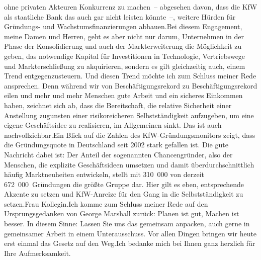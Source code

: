 \documentclass{article}
\begin{document}
ohne privaten Akteuren Konkurrenz zu machen – abgesehen davon, dass die KfW als staatliche Bank das auch gar nicht leisten könnte –, weitere Hürden für Gründungs- und Wachstumsfinanzierungen abbauen.Bei diesem Engagement, meine Damen und Herren, geht es aber nicht nur darum, Unternehmen in der Phase der Konsolidierung und auch der Markterweiterung die Möglichkeit zu geben, das notwendige Kapital für Investitionen in Technologie, Vertriebswege und Markt­erschließung zu akquirieren, sondern es gilt gleichzeitig auch, einem Trend entgegenzusteuern. Und diesen Trend möchte ich zum Schluss meiner Rede ansprechen. Denn während wir von Beschäftigungsrekord zu Beschäftigungsrekord eilen und mehr und mehr Menschen gute Arbeit und ein sicheres Einkommen haben, zeichnet sich ab, dass die Bereitschaft, die relative Sicherheit einer Anstellung zugunsten einer risikoreicheren Selbstständigkeit aufzugeben, um eine eigene Geschäftsidee zu realisieren, im Allgemeinen sinkt. Das ist auch nachvollziehbar.Ein Blick auf die Zahlen des KfW-Gründungsmonitors zeigt, dass die Gründungsquote in Deutschland seit 2002 stark gefallen ist. Die gute Nachricht dabei ist: Der Anteil der sogenannten Chancengründer, also der Menschen, die explizite Geschäftsideen umsetzen und damit überdurchschnittlich häufig Marktneuheiten entwickeln, stellt mit 310 000 von derzeit 672 000 Gründungen die größte Gruppe dar. Hier gilt es eben, entsprechende Akzente zu setzen und KfW-Anreize für den Gang in die Selbstständigkeit zu setzen.Frau Kollegin.Ich komme zum Schluss meiner Rede auf den Ursprungsgedanken von George Marshall zurück: Planen ist gut, Machen ist besser. In diesem Sinne: Lassen Sie uns das gemeinsam anpacken, auch gerne in gemeinsamer Arbeit in einem Unterausschuss. Vor allen Dingen bringen wir heute erst einmal das Gesetz auf den Weg.Ich bedanke mich bei Ihnen ganz herzlich für Ihre Aufmerksamkeit.
\end{document}
